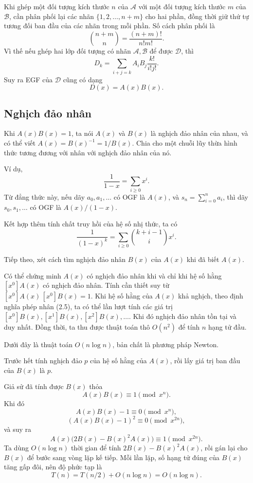 \documentclass[11pt]{article}
\begin{document}
Khi ghép một đối tượng kích thước \(n\) của \(\mathcal A\) với một đối tượng
kích thước \(m\) của \(\mathcal B\), cần phân phối lại các nhãn
\(\{1,2,\ldots,n+m\}\) cho hai phần, đồng thời giữ thứ tự tương đối ban đầu của
các nhãn trong mỗi phần. Số cách phân phối là
\[
  \binom{n+m}{n}=\frac{(n+m)!}{n!m!}. \tag{3.7}
\]
Vì thế nếu ghép hai lớp đối tượng có nhãn \(\mathcal A,\mathcal B\) để được
\(\mathcal D\), thì
\[
  D_k=\sum_{i+j=k}A_iB_j\frac{k!}{i!j!}. \tag{3.8}
\]
Suy ra EGF của \(\mathcal D\) cũng có dạng
\[
  D(x)=A(x)B(x). \tag{3.9}
\]

\subsection{Nghịch đảo nhân}

Khi \(A(x)B(x)=1\), ta nói \(A(x)\) và \(B(x)\) là nghịch đảo nhân của nhau, và
có thể viết \(A(x)=B(x)^{-1}=1/B(x)\). Chia cho một chuỗi lũy thừa hình thức
tương đương với nhân với nghịch đảo nhân của nó.

Ví dụ,
\[
  \frac1{1-x}=\sum_{i\ge 0}x^i. \tag{4.1}
\]
Từ đẳng thức này, nếu dãy \(a_0,a_1,\ldots\) có OGF là \(A(x)\), và
\(s_n=\sum_{i=0}^n a_i\), thì dãy \(s_0,s_1,\ldots\) có OGF là
\(A(x)/(1-x)\).

Kết hợp thêm tính chất truy hồi của hệ số nhị thức, ta có
\[
  \frac1{(1-x)^k}=\sum_{i\ge 0}\binom{k+i-1}{i}x^i. \tag{4.2}
\]

Tiếp theo, xét cách tìm nghịch đảo nhân \(B(x)\) của \(A(x)\) khi đã biết
\(A(x)\).

Có thể chứng minh \(A(x)\) có nghịch đảo nhân khi và chỉ khi hệ số hằng
\([x^0]A(x)\) có nghịch đảo nhân. Tính cần thiết suy từ
\([x^0]A(x)\,[x^0]B(x)=1\). Khi hệ số hằng của \(A(x)\) khả nghịch, theo định
nghĩa phép nhân (2.5), ta có thể lần lượt tính các giá trị
\([x^0]B(x),[x^1]B(x),[x^2]B(x),\ldots\). Khi đó nghịch đảo nhân tồn tại và duy
nhất. Đồng thời, ta thu được thuật toán thô \(O(n^2)\) để tính \(n\) hạng tử
đầu.

Dưới đây là thuật toán \(O(n\log n)\), bản chất là phương pháp Newton.

Trước hết tính nghịch đảo \(p\) của hệ số hằng của \(A(x)\), rồi lấy giá trị
ban đầu của \(B(x)\) là \(p\).

Giả sử đã tính được \(B(x)\) thỏa
\[
  A(x)B(x)\equiv 1\pmod{x^n}. \tag{4.3}
\]
Khi đó
\[
  A(x)B(x)-1\equiv 0\pmod{x^n},
\]
\[
  (A(x)B(x)-1)^2\equiv 0\pmod{x^{2n}},
\]
và suy ra
\[
  A(x)\bigl(2B(x)-B(x)^2A(x)\bigr)\equiv 1\pmod{x^{2n}}. \tag{4.4}
\]
Ta dùng \(O(n\log n)\) thời gian để tính \(2B(x)-B(x)^2A(x)\), rồi gán lại cho
\(B(x)\) để bước sang vòng lặp kế tiếp. Mỗi lần lặp, số hạng tử đúng của
\(B(x)\) tăng gấp đôi, nên độ phức tạp là
\[
  T(n)=T(n/2)+O(n\log n)=O(n\log n).
\]
\end{document}

